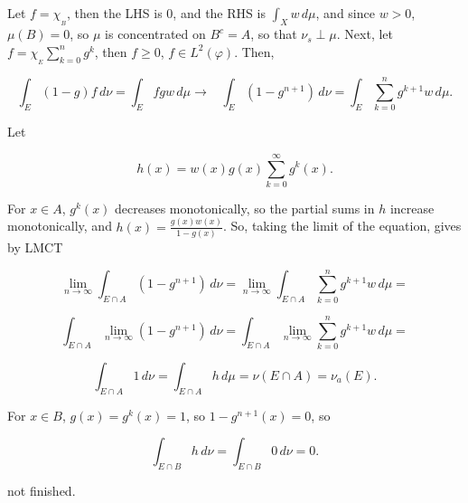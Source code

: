 \documentclass[12pt]{article}
\newcommand{\rarw}[0] { \rightarrow }
\begin{document}
\noindent

Let $f = \chi_{_B}$, then the LHS is $0$, and the RHS is $\int_X w \, d\mu$, and since $w > 0$, $\mu(B) = 0$, so $\mu$ is concentrated on $B^c = A$, so that $\nu_s \perp \mu$. Next, let $ f = \chi_{_E}  \sum_{k=0}^n g^k$, then $f \ge 0$, $f \in L^2(\varphi)$. Then,

$$
    \int_E (1-g) f \, d\nu = \int_E fgw \, d\mu \rarw \hspace{10pt} \int_E (1-g^{n+1}) \, d\nu = \int_E \sum_{k=0}^n g^{k+1} w \, d\mu.
$$

\noindent Let 

$$
h(x) = w(x)  g(x)\sum_{k=0}^\infty g^{k}(x).
$$

\noindent 
For $x \in A$, $g^k(x)$ decreases monotonically, so the partial sums in $h$ increase monotonically, and $ h(x) = \frac{g(x) w(x)}{1-g(x)}$. So, taking the limit of the equation, gives by LMCT 

$$
\lim_{n \rarw \infty}  \int_{E \cap A} (1-g^{n+1}) \, d\nu =  \lim_{n \rarw \infty}  \int_{E \cap A} \sum_{k=0}^n g^{k+1} w \, d\mu =
$$

$$
\int_{E \cap A}  \lim_{n \rarw \infty}  (1-g^{n+1}) \, d\nu =  \int_{E \cap A} \lim_{n \rarw \infty}   \sum_{k=0}^n g^{k+1} w \, d\mu =
$$

$$
\int_{E \cap A} 1 \, d\nu =  \int_{E \cap A} h \, d\mu = \nu(E \cap A) = \nu_a(E).
$$


\noindent 
For $x \in B$, $g(x) = g^k(x) = 1$, so $1-g^{n+1}(x) = 0$, so

$$
\int_{E \cap B} h \, d\nu = \int_{E \cap B} 0 \, d\nu = 0.
$$

\noindent
not finished.
\end{document}
